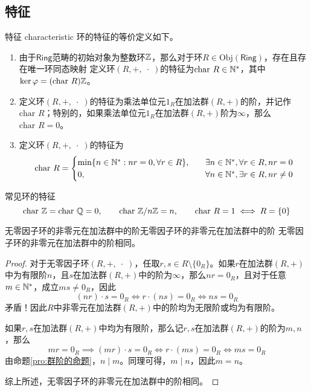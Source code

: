 \subsection{特征}

\begin{definition}{特征 characteristic}
	环的特征的等价定义如下。
	\begin{enumerate}
		\item 由于$\mathsf{Ring}$范畴的初始对象为整数环$\mathbb{Z}$，那么对于环$R\in \mathrm{Obj}(\mathsf{Ring})$，存在且存在唯一环同态映射
		定义环$(R,+,\;\cdot\;)$的特征为$\text{char }R\in \mathbb{N}^*$，其中$\ker\varphi=(\text{char }R)\mathbb{Z}$。
		\item 定义环$(R,+,\;\cdot\;)$的特征为乘法单位元$1_R$在加法群$(R,+)$的阶，并记作$\text{char }R$；特别的，如果乘法单位元$1_R$在加法群$(R,+)$阶为$\infty$，那么$\text{char }R=0$。
		\item 定义环$(R,+,\;\cdot\;)$的特征为
		$$
		\text{char }R=\begin{cases}
			\min\{ n\in\mathbb{N}^*:nr=0,\forall r\in R \},\quad & \exists n\in\mathbb{N}^*,\forall r\in R,nr=0\\
			0,\quad & \forall n\in\mathbb{N}^*,\exists r\in R,nr\ne0
		\end{cases}
		$$
	\end{enumerate}
\end{definition}

\begin{proposition}{常见环的特征}
	$$
	\text{char }\mathbb{Z}=\text{char }\mathbb{Q}=0,\qquad 
	\text{char }\mathbb{Z}/n\mathbb{Z}=n,\qquad 
	\text{char }R=1\iff R=\{0\} 
	$$
\end{proposition}

\begin{proposition}{无零因子环的非零元在加法群中的阶}{无零因子环的非零元在加法群中的阶}
	无零因子环的非零元在加法群中的阶相同。
\end{proposition}

\begin{proof}
	对于无零因子环$(R,+,\;\cdot\;)$，任取$r,s\in R\setminus\{0_R\}$。如果$r$在加法群$(R,+)$中为有限阶$n$，且$s$在加法群$(R,+)$中的阶为$\infty$，那么$nr=0_R$，且对于任意$m\in\mathbb{N}^*$，成立$ms\ne 0_R$，因此
	$$
	(nr)\cdot s=0_R\iff 
	r\cdot (ns)=0_R\iff 
	ns=0_R
	$$
	矛盾！因此$R$中非零元在加法群$(R,+)$中的阶均为无限阶或均为有限阶。
	
	如果$r,s$在加法群$(R,+)$中均为有限阶，那么记$r,s$在加法群$(R,+)$的阶为$m,n$，那么
	$$
	mr=0_R\implies
	(mr)\cdot s=0_R\iff
	r\cdot(m s)=0_R\iff
	ms=0_R
	$$
	由命题\ref{pro:群阶的命题}，$n\mid m$。同理可得，$m\mid n$，因此$m=n$。
	
	综上所述，无零因子环的非零元在加法群中的阶相同。
\end{proof}


